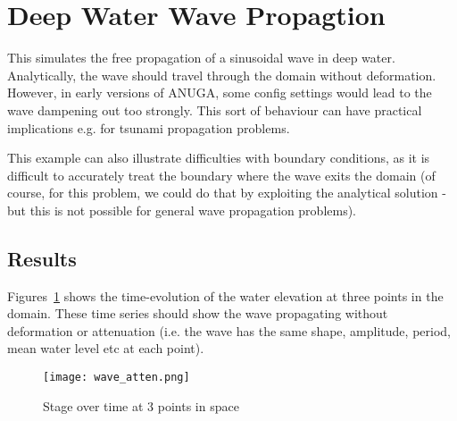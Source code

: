\section{Deep Water Wave Propagtion}
This simulates the free propagation of a sinusoidal wave in deep water. Analytically, the wave should travel through the domain without deformation. However, in early versions of ANUGA, some config settings would lead to the wave dampening out too strongly. This sort of behaviour can have practical implications e.g. for tsunami propagation problems.  

This example can also illustrate difficulties with boundary conditions, as it is difficult to accurately treat the boundary where the wave exits the domain (of course, for this problem, we could do that by exploiting the analytical solution - but this is not possible for general wave propagation problems).

\subsection{Results}
Figures~\ref{stagewave} shows the time-evolution of the water elevation at three points in the domain. These time series should show the wave propagating without deformation or attenuation (i.e. the wave has the same shape, amplitude, period, mean water level etc at each point).  
\begin{figure}[h]
\begin{center}
\texttt{[image: wave\_atten.png]}
\caption{Stage over time at 3 points in space}
\label{stagewave}
\end{center}
\end{figure}



\endinput
